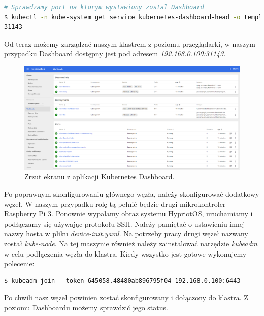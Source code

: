 \documentclass[12pt]{report}
\begin{document}
{\begin{lstlisting}[language=bash]
# Sprawdzamy port na ktorym wystawiony zostal Dashboard
$ kubectl -n kube-system get service kubernetes-dashboard-head -o template --template="{{ (index .spec.ports 0).nodePort }}"
31143
\end{lstlisting}

Od teraz możemy zarządzać naszym klastrem z poziomu przeglądarki, w naszym przypadku Dashboard dostępny jest pod adresem \textit{192.168.0.100:31143}.

\begin{figure}[h]
	\centering
	\includegraphics[width=1\textwidth]{images/dashboard.png}
	\caption{Zrzut ekranu z aplikacji Kubernetes Dashboard.}
\end{figure}
\FloatBarrier

Po poprawnym skonfigurowaniu głównego węzła, należy skonfigurować dodatkowy węzeł. W naszym przypadku rolę tą pełnić będzie drugi mikrokontroler Raspberry Pi 3. Ponownie wypalamy obraz systemu HypriotOS, uruchamiamy i podłączamy się używając protokołu SSH. Należy pamiętać o ustawieniu innej nazwy hosta w pliku \textit{device-init.yaml}. Na potrzeby pracy drugi węzeł nazwany został \textit{kube-node}. Na tej maszynie również należy zainstalować narzędzie \textit{kubeadm} w celu podłączenia węzła do klastra. Kiedy wszystko jest gotowe wykonujemy polecenie:

\begin{lstlisting}
$ kubeadm join --token 645058.48480ab896795f04 192.168.0.100:6443
\end{lstlisting}

Po chwili nasz węzeł powinien zostać skonfigurowany i dołączony do klastra. Z poziomu Dashboardu możemy sprawdzić jego status.

}
\end{document}

